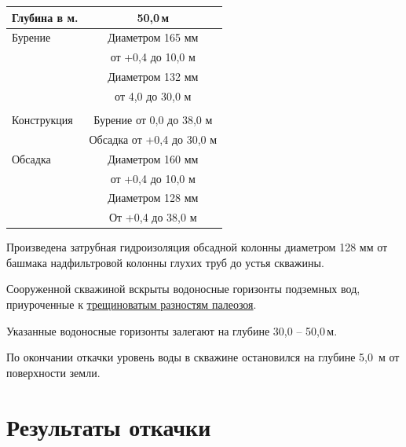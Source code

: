 \documentclass[a4paper,12pt]{article} %
\newcommand{\txtDepth}{50,0}						%
\newcommand{\txtGeology}{трещиноватым разностям палеозоя}
\newcommand{\txtLevel}{5,0}							%
\begin{document}
\begin{center}
\begin{tabular}{|l|c|}
	\hline 
	Глубина в м. & \txtDepth \,м \\ 
	\hline 
	Бурение & Диаметром 165 мм \\ 
	& от +0,4 до 10,0 м \\ 
	& Диаметром 132 мм \\ 
	& от 4,0 до 30,0 м \\ 
	&  \\ 
	\hline 
	Конструкция & Бурение от 0,0 до 38,0 м \\ 
	& Обсадка от +0,4 до 30,0 м \\ 
	\hline 
	Обсадка & Диаметром 160 мм \\ 
	& от +0,4 до 10,0 м \\ 
	& Диаметром 128 мм  \\ 
	& От +0,4 до 38,0 м \\ 
	\hline 
\end{tabular} 
\end{center}

\bigskip

Произведена затрубная гидроизоляция обсадной колонны диаметром 128 мм от башмака надфильтровой колонны глухих труб до устья скважины.

Сооруженной скважиной вскрыты водоносные горизонты  подземных вод, приуроченные к \underline{\txtGeology}.

Указанные водоносные горизонты залегают на глубине   30,0 – \txtDepth \,м.

По окончании откачки уровень воды в скважине остановился на глубине  \txtLevel \, м от поверхности земли.

\section*{Результаты откачки}
\end{document}

